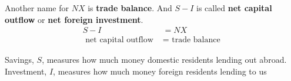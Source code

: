 \documentclass[12pt]{article}
\begin{document}
Another name for $ NX $ is {\textbf {trade balance}}. And $ S - I $ is called
{\textbf {net capital outflow}} or {\textbf {net foreign investment}}.
\begin{align*}
S - I &= NX\\
\text{ net capital outflow } &= \text{ trade balance }
\end{align*}

Savings, $ S $, measures how much money domestic residents lending out abroad.
Investment, $ I $, measures how much money foreign residents lending to us










%
%
\end{document}
